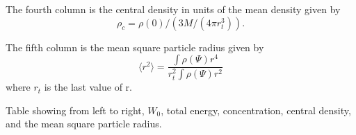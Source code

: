 The fourth column is the central density in units of the mean density given by
\begin{equation}
    \rho_c = \rho(0)/(3M/(4\pi r_t^3)).
\end{equation}

The fifth column is the mean square particle radius given by
\begin{equation}
\langle r^2 \rangle = \frac{\int\rho(\Psi)r^4}{r_t^2 \int\rho(\Psi)r^2}
\end{equation}
where $r_t$ is the last value of r.

\begin{table}
    \centering
    
    \caption{Table showing from left to right, $W_0$, total energy, concentration, central density, and the mean square particle radius.}
    \label{tab:KingModel}
\end{table}
